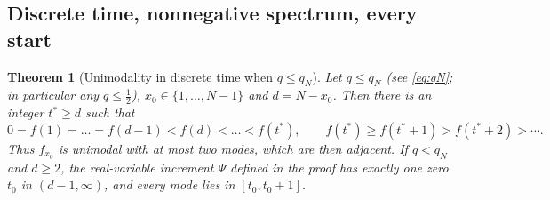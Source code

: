 \documentclass[11pt,a4paper]{article}
\newtheorem{theorem}{Theorem}[section]
\theoremstyle{definition}
\theoremstyle{remark}
\begin{document}
\subsection{Discrete time, nonnegative spectrum, every start}

\begin{theorem}[Unimodality in discrete time when $q\le q_N$]\label{thm:unimodal-disc}
Let $q\le q_N$ (see \eqref{eq:qN}; in particular any $q\le\frac12$), $x_0\in\{1,\dots,N-1\}$ and $d=N-x_0$. Then
there is an integer $t^*\ge d$ such that
\[
 0=f(1)=\dots=f(d-1)<f(d)<\dots<f(t^*),\qquad f(t^*)\ge f(t^*+1)>f(t^*+2)>\cdots .
\]
Thus $f_{x_0}$ is unimodal with at most two modes, which are then adjacent. If $q<q_N$ and $d\ge2$, the real-variable
increment $\Psi$ defined in the proof has exactly one zero $t_0$ in $(d-1,\infty)$, and every mode lies in $[t_0,t_0+1]$.
\end{theorem}
\end{document}
